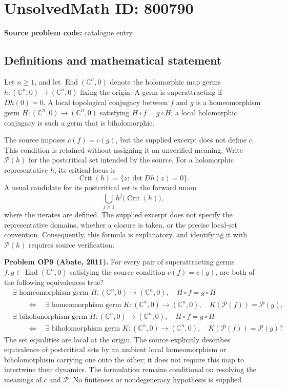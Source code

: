 \documentclass[11pt]{article}
\newcommand{\C}{\mathbb{C}}
\begin{document}
\section*{UnsolvedMath ID: 800790}
\textbf{Source problem code:} catalogue entry
\subsection{Definitions and mathematical statement}
Let \(n\geq 1\), and let \(\operatorname{End}(\C^n,0)\) denote the holomorphic map germs \(h:(\C^n,0)\to(\C^n,0)\) fixing the origin. A germ is superattracting if \(Dh(0)=0\). A local topological conjugacy between \(f\) and \(g\) is a homeomorphism germ \(H:(\C^n,0)\to(\C^n,0)\) satisfying \(H\circ f=g\circ H\); a local holomorphic conjugacy is such a germ that is biholomorphic.

The source imposes \(c(f)=c(g)\), but the supplied excerpt does not define \(c\). This condition is retained without assigning it an unverified meaning. Write \(\mathcal P(h)\) for the postcritical set intended by the source. For a holomorphic representative \(h\), its critical locus is
\[
\operatorname{Crit}(h)=\{z:\det Dh(z)=0\}.
\]
A usual candidate for its postcritical set is the forward union
\[
\bigcup_{j\geq 1}h^j\bigl(\operatorname{Crit}(h)\bigr),
\]
where the iterates are defined. The supplied excerpt does not specify the representative domains, whether a closure is taken, or the precise local-set convention. Consequently, this formula is explanatory, and identifying it with \(\mathcal P(h)\) requires source verification.

\textbf{Problem OP9 (Abate, 2011).} For every pair of superattracting germs \(f,g\in\operatorname{End}(\C^n,0)\) satisfying the source condition \(c(f)=c(g)\), are both of the following equivalences true?
\[
\begin{aligned}
&\exists\text{ homeomorphism germ }H:(\C^n,0)\to(\C^n,0),\quad H\circ f=g\circ H\\
&\qquad\Longleftrightarrow\quad
\exists\text{ homeomorphism germ }K:(\C^n,0)\to(\C^n,0),\quad K(\mathcal P(f))=\mathcal P(g),
\end{aligned}
\]
\[
\begin{aligned}
&\exists\text{ biholomorphism germ }H:(\C^n,0)\to(\C^n,0),\quad H\circ f=g\circ H\\
&\qquad\Longleftrightarrow\quad
\exists\text{ biholomorphism germ }K:(\C^n,0)\to(\C^n,0),\quad K(\mathcal P(f))=\mathcal P(g)?
\end{aligned}
\]
The set equalities are local at the origin. The source explicitly describes equivalence of postcritical sets by an ambient local homeomorphism or biholomorphism carrying one onto the other; it does not require this map to intertwine their dynamics. The formulation remains conditional on resolving the meanings of \(c\) and \(\mathcal P\). No finiteness or nondegeneracy hypothesis is supplied.
\end{document}
